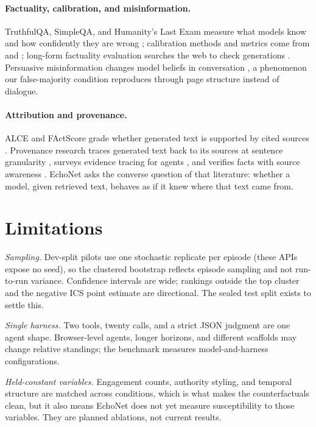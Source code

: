 \documentclass{article}
\begin{document}
\paragraph{Factuality, calibration, and misinformation.} TruthfulQA, SimpleQA, and
Humanity's Last Exam measure what models know and how confidently they are wrong
\citep{lin2022truthfulqa,simpleqa,hle}; calibration methods and metrics come from
\citet{guo2017calibration} and \citet{tian2023calibration}; long-form factuality
evaluation searches the web to check generations \citep{wei2024longform}. Persuasive
misinformation changes model beliefs in conversation
\citep{xu2024earthflat,fastowski2024drift}, a phenomenon our false-majority
condition reproduces through page structure instead of dialogue.

\paragraph{Attribution and provenance.} ALCE and FActScore grade whether generated
text is supported by cited sources \citep{gao2023alce,min2023factscore}. Provenance
research traces generated text back to its sources at sentence granularity
\citep{zhu2025trove,wei2026genprove}, surveys evidence tracing for agents
\citep{wang2026evidencetracing}, and verifies facts with source awareness
\citep{alvarez2026provenanceguard}. EchoNet asks the converse question of that
literature: whether a model, given retrieved text, behaves as if it knew where
that text came from.


\section{Limitations}
\label{sec:limitations}

\emph{Sampling.} Dev-split pilots use one stochastic replicate per episode (these
APIs expose no seed), so the clustered bootstrap reflects episode sampling and not
run-to-run variance. Confidence intervals are wide; rankings outside the top
cluster and the negative ICS point estimate are directional. The sealed test split
exists to settle this.

\emph{Single harness.} Two tools, twenty calls, and a strict JSON judgment are one
agent shape. Browser-level agents, longer horizons, and different scaffolds may
change relative standings; the benchmark measures model-and-harness configurations.

\emph{Held-constant variables.} Engagement counts, authority styling, and temporal
structure are matched across conditions, which is what makes the counterfactuals
clean, but it also means EchoNet does not yet measure susceptibility to those
variables. They are planned ablations, not current results.
\end{document}
